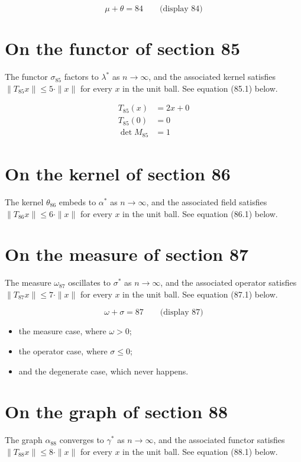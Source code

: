 \documentclass{article}
\begin{document}
$$
\mu + \theta = 84 \qquad \text{(display 84)}
$$

\section{On the functor of section 85}
The functor $\sigma_{85}$ factors to $\lambda^{*}$ as $n \to \infty$,
and the associated kernel satisfies $\|T_{85} x\| \leq 5 \cdot \|x\|$
for every $x$ in the unit ball. See equation (85.1) below.

\begin{align}
T_{85}(x) &= 2 x + 0 \\
T_{85}(0) &= 0 \\
\det M_{85} &= 1
\end{align}

\section{On the kernel of section 86}
The kernel $\theta_{86}$ embeds to $\alpha^{*}$ as $n \to \infty$,
and the associated field satisfies $\|T_{86} x\| \leq 6 \cdot \|x\|$
for every $x$ in the unit ball. See equation (86.1) below.

\section{On the measure of section 87}
The measure $\omega_{87}$ oscillates to $\sigma^{*}$ as $n \to \infty$,
and the associated operator satisfies $\|T_{87} x\| \leq 7 \cdot \|x\|$
for every $x$ in the unit ball. See equation (87.1) below.

$$
\omega + \sigma = 87 \qquad \text{(display 87)}
$$

\begin{itemize}
  \item the measure case, where $\omega > 0$;
  \item the operator case, where $\sigma \leq 0$;
  \item and the degenerate case, which never happens.
\end{itemize}

\section{On the graph of section 88}
The graph $\alpha_{88}$ converges to $\gamma^{*}$ as $n \to \infty$,
and the associated functor satisfies $\|T_{88} x\| \leq 8 \cdot \|x\|$
for every $x$ in the unit ball. See equation (88.1) below.
\end{document}
